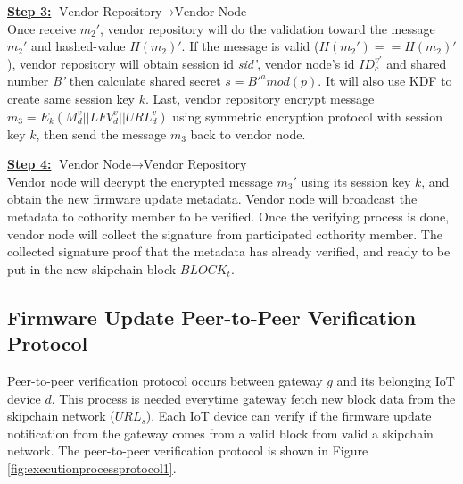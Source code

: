 \noindent \underline{\textbf{Step 3:}} $\text{Vendor Repository}\rightarrow\text{Vendor Node}$ \\
\indent Once receive \textit{$m_2'$}, vendor repository will do the validation toward the message \textit{$m_2'$} and hashed-value \textit{$H(m_2)'$}. If the message is valid (\textit{$H(m_2')==H(m_2)'$}), vendor repository will obtain session id \textit{sid'}, vendor node's id \textit{$ID_c^{v'}$} and shared number \textit{B'} then calculate shared secret \textit{$s=B'^amod(p)$}. It will also use KDF to create same session key \textit{$k$}. Last, vendor repository encrypt message \textit{$m_3=E_k(M_d^v||LFV_d^v||URL_d^v)$} using symmetric encryption protocol with session key \textit{$k$}, then send the message \textit{$m_3$} back to vendor node.

\noindent \underline{\textbf{Step 4:}} $\text{Vendor Node}\rightarrow\text{Vendor Repository}$ \\
\indent Vendor node will decrypt the encrypted message \textit{$m_3'$} using its session key \textit{$k$}, and obtain the new firmware update metadata. Vendor node will broadcast the metadata to cothority member to be verified. Once the verifying process is done, vendor node will collect the signature from participated cothority member. The collected signature proof that the metadata has already verified, and ready to be put in the new skipchain block \textit{$BLOCK_t$}.

\subsection{Firmware Update Peer-to-Peer Verification Protocol}
\label{sec:p2pverificationprotocol}

Peer-to-peer verification protocol occurs between gateway \textit{$g$} and its belonging IoT device \textit{$d$}. This process is needed everytime gateway fetch new block data from the skipchain network (\textit{$URL_s$}). Each IoT device can verify if the firmware update notification from the gateway comes from a valid block from valid a skipchain network. The peer-to-peer verification protocol is shown in Figure \ref{fig:executionprocessprotocol1}.

